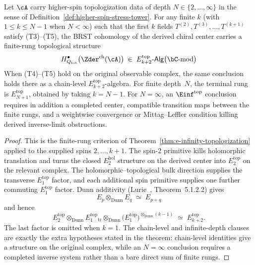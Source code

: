 \begin{theorem}
\label{thm:e-infinity-topologization-master}
\ClaimStatusConditional
{}%
%
%
%
Let $\cA$ carry higher-spin topologization data of depth
$N \in \{2,\ldots,\infty\}$ in the sense of
Definition~\textup{\ref{def:higher-spin-stress-tower}}.
For any finite $k$ \textup{(}with $1\leq k\leq N-1$ when
$N<\infty$\textup{)} such that the first $k$ fields
$T^{(2)},T^{(3)},\ldots,T^{(k+1)}$ satisfy
\textup{(T3)--(T5)}, the BRST cohomology of the derived
chiral center carries a finite-rung topological structure
\[
 H^\bullet_{Q_{\mathrm{tot}}}\bigl(\Zder^{\mathrm{ch}}(\cA)\bigr)
 \;\in\;
 E_{k+2}^{\mathrm{top}}\text{-}\mathsf{Alg}\bigl(\bC
 \text{-mod}\bigr)
\]
When (T4)--(T5) hold on the original observable complex, the
same conclusion holds there as a chain-level
$E_{k+2}^{\mathrm{top}}$-algebra. For finite depth~$N$, the
terminal rung is $E_{N+1}^{\mathrm{top}}$, obtained by taking
$k=N-1$. For $N=\infty$, an $\Einf^{\mathrm{top}}$ conclusion
requires in addition a completed center, compatible transition
maps between the finite rungs, and a weightwise convergence or
Mittag--Leffler condition killing derived inverse-limit
obstructions.
\end{theorem}

\begin{proof}
This is the finite-rung criterion of
Theorem~\ref{thm:e-infinity-topologization} applied to the
supplied spins $2,\ldots,k+1$. The spin-$2$ primitive kills
holomorphic translation and turns the closed
$E_2^{\mathrm{hol}}$ structure on the derived center into
$E_2^{\mathrm{top}}$ on the relevant complex. The
holomorphic--topological bulk direction supplies the
transverse $E_1^{\mathrm{top}}$ factor, and each additional
spin primitive supplies one further commuting
$E_1^{\mathrm{top}}$ factor. Dunn additivity
\textup{(}Lurie~\cite{HA}, Theorem~5.1.2.2\textup{)} gives
\[
 E_p \otimes_{\mathrm{Dunn}} E_q \;\simeq\; E_{p+q}
\]
and hence
\[
 E_2^{\mathrm{top}}
 \otimes_{\mathrm{Dunn}}
 E_1^{\mathrm{top}}_{\mathrm{tr}}
 \otimes_{\mathrm{Dunn}}
 \bigl(E_1^{\mathrm{top}}\bigr)^{\otimes_{\mathrm{Dunn}}(k-1)}
 \;\simeq\;
 E_{k+2}^{\mathrm{top}}.
\]
The last factor is omitted when $k=1$.
The chain-level and infinite-depth clauses are exactly the
extra hypotheses stated in the theorem: chain-level
identities give a structure on the original complex, while an
$N=\infty$ conclusion requires a completed inverse system
rather than a bare direct sum of finite rungs.
\end{proof}

